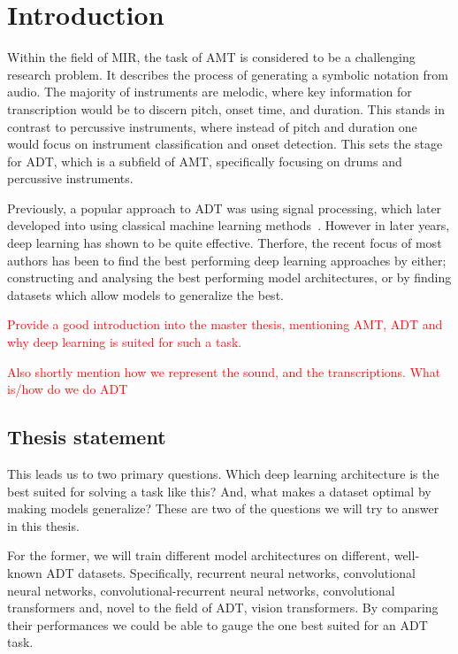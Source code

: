 \chapter{Introduction}

Within the field of \gls{MIR}, the task of \gls{AMT} is considered to be a challenging research problem. It describes the process of generating a symbolic notation from audio. The majority of instruments are melodic, where key information for transcription would be to discern pitch, onset time, and duration. This stands in contrast to percussive instruments, where instead of pitch and duration one would focus on instrument classification and onset detection. This sets the stage for \gls{ADT}, which is a subfield of \gls{AMT}, specifically focusing on drums and percussive instruments.~\cite{8350302}

Previously, a popular approach to \gls{ADT} was using signal processing, which later developed into using classical machine learning methods~\cite{8350302}. However in later years, deep learning has shown to be quite effective. Therfore, the recent focus of most authors has been to find the best performing deep learning approaches by either; constructing and analysing the best performing model architectures, or by finding datasets which allow models to generalize the best.~\cite{signals4040042}

\textcolor{red}{Provide a good introduction into the master thesis, mentioning \gls{AMT}, \gls{ADT} and why deep learning is suited for such a task.}

\textcolor{red}{Also shortly mention how we represent the sound, and the transcriptions. What is/how do we do \gls{ADT}}

\section{Thesis statement}

This leads us to two primary questions. Which deep learning architecture is the best suited for solving a task like this? And, what makes a dataset optimal by making models generalize? These are two of the questions we will try to answer in this thesis. 

For the former, we will train different model architectures on different, well-known \gls{ADT} datasets. Specifically, recurrent neural networks, convolutional neural networks, convolutional-recurrent neural networks, convolutional transformers and, novel to the field of \gls{ADT}, vision transformers. By comparing their performances we could be able to gauge the one best suited for an \gls{ADT} task.

